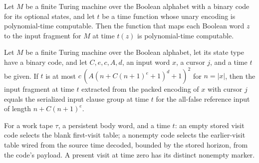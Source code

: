 \begin{lemma}
\label{Complexity.clA5InputFragment_native}
\leanok
{}
Let $M$ be a finite Turing machine over the Boolean alphabet with a binary code for its
optional states, and let $t$ be a time function whose unary encoding is polynomial-time
computable. Then the function that maps each Boolean word $z$ to the input fragment for
$M$ at time $t(z)$ is polynomial-time computable.
\end{lemma}

\begin{lemma}
\label{Complexity.clA5InputFragment_exact}
\leanok
{}
Let $M$ be a finite Turing machine over the Boolean alphabet, let its state type have a
binary code, and let $C,e,c,A,d$, an input word $x$, a cursor $j$, and a time $t$ be
given. If $t$ is at most $c\,(A(n+C(n+1)^e+1)^d+1)^2$ for $n=|x|$, then the input
fragment at time $t$ extracted from the packed encoding of $x$ with cursor $j$ equals
the serialized input clause group at time $t$ for the all-false reference input of
length $n+C(n+1)^e$.
\end{lemma}

\begin{definition}
\label{Complexity.clA5WorkFragment}
\leanok
{}
For a work tape $\tau$, a persistent body word, and a time $t$: an empty stored visit code selects the blank first-visit table; a nonempty code selects the earlier-visit table wired from the source time decoded, bounded by the stored horizon, from the code's payload. A present visit at time zero has its distinct nonempty marker.
\end{definition}

